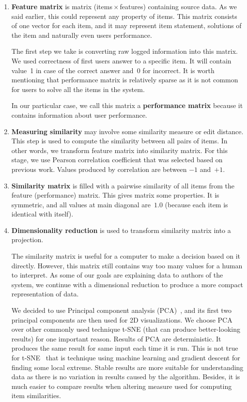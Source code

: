 \documentclass[
  printed, %
  table,   %
  nolof,     %
  nolot,     %
  color,
  final,
  nocover
]{fithesis3}
\begin{document}
\begin{enumerate}
  \item
    \textbf{Feature matrix} is matrix (items\,$\times$\,features) containing source data. As we said earlier, this could represent any property of items. This matrix consists of one vector for each item, and it may represent item statement, solutions of the item and naturally even users performance.

    The first step we take is converting raw logged information into this matrix. We used correctness of first users answer to a specific item. It will contain value~1 in case of the correct answer and~0 for incorrect. It is worth mentioning that performance matrix is relatively sparse as it is not common for users to solve all the items in the system.

    In our particular case, we call this matrix a \textbf{performance matrix} because it contains information about user performance.

  \item
    \textbf{Measuring similarity} may involve some similarity measure or edit distance. This step is used to compute the similarity between all pairs of items. In other words, we transform feature matrix into similarity matrix. For this stage, we use Pearson correlation coefficient that was selected based on previous work. Values produced by correlation are between $-1$ and~$+1$.

  \item
    \textbf{Similarity matrix} is filled with a pairwise similarity of all items from the feature (performance) matrix. This gives matrix some properties. It is symmetric, and all values at main diagonal are~$1.0$ (because each item is identical with itself).

  \item
    \textbf{Dimensionality reduction} is used to transform similarity matrix into a projection.


    The similarity matrix is useful for a computer to make a decision based on it directly. However, this matrix still contains way too many values for a human to interpret. As some of our goals are explaining data to authors of the system, we continue with a dimensional reduction to produce a more compact representation of data.


    We decided to use Principal component analysis (PCA)~\cite{wold1987principal}, and its first two principal components are then used for 2D visualizations. We choose PCA over other commonly used technique t-SNE (that can produce better-looking results) for one important reason. Results of PCA are deterministic. It produces the same result for same input each time it is run. This is not true for t-SNE~\cite{maaten2008visualizing} that is technique using machine learning and gradient descent for finding some local extreme. Stable results are more suitable for understanding data as there is no variation in results caused by the algorithm. Besides, it is much easier to compare results when altering measure used for computing item similarities.


\end{enumerate}
\end{document}
